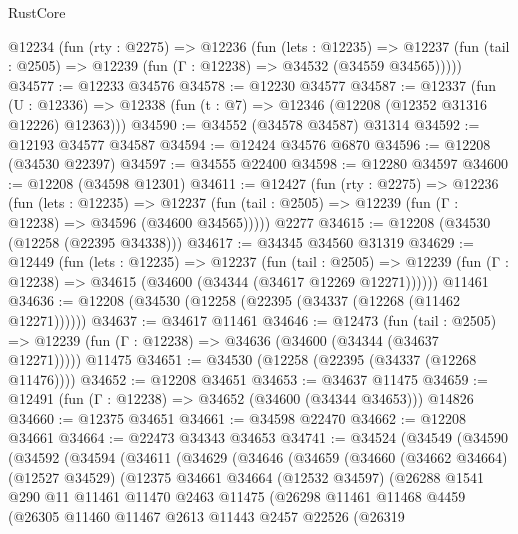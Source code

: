 \begin{lexlean}{RustCore}
\begin{coremodule}
  @12234
    (fun (rty : @2275) =>
    @12236
      (fun (lets : @12235) =>
      @12237 (fun (tail : @2505) => @12239 (fun (Γ : @12238) => @34532 (@34559 @34565)))))
@34577 := @12233 @34576
@34578 := @12230 @34577
@34587 := @12337
    (fun (U : @12336) => @12338 (fun (t : @7) => @12346 (@12208 (@12352 @31316 @12226) @12363)))
@34590 := @34552 (@34578 @34587) @31314
@34592 := @12193 @34577 @34587
@34594 := @12424 @34576 @6870
@34596 := @12208 (@34530 @22397)
@34597 := @34555 @22400
@34598 := @12280 @34597
@34600 := @12208 (@34598 @12301)
@34611 := @12427
    (fun (rty : @2275) =>
    @12236
      (fun (lets : @12235) =>
      @12237 (fun (tail : @2505) => @12239 (fun (Γ : @12238) => @34596 (@34600 @34565)))))
    @2277
@34615 := @12208 (@34530 (@12258 (@22395 @34338)))
@34617 := @34345 @34560 @31319
@34629 := @12449
    (fun (lets : @12235) =>
    @12237
      (fun (tail : @2505) =>
      @12239 (fun (Γ : @12238) => @34615 (@34600 (@34344 (@34617 @12269 @12271))))))
    @11461
@34636 := @12208 (@34530 (@12258 (@22395 (@34337 (@12268 (@11462 @12271))))))
@34637 := @34617 @11461
@34646 := @12473
    (fun (tail : @2505) => @12239 (fun (Γ : @12238) => @34636 (@34600 (@34344 (@34637 @12271)))))
    @11475
@34651 := @34530 (@12258 (@22395 (@34337 (@12268 @11476))))
@34652 := @12208 @34651
@34653 := @34637 @11475
@34659 := @12491 (fun (Γ : @12238) => @34652 (@34600 (@34344 @34653))) @14826
@34660 := @12375 @34651
@34661 := @34598 @22470
@34662 := @12208 @34661
@34664 := @22473 @34343 @34653
@34741 := @34524
    (@34549
      (@34590
        (@34592
          (@34594
            (@34611
              (@34629
                (@34646
                  (@34659
                    (@34660
                      (@34662 @34664)
                      (@12527 @34529)
                      (@12375
                        @34661
                        @34664
                        (@12532 @34597)
                        (@26288
                          @1541
                          @290
                          @11
                          @11461
                          @11470
                          @2463
                          @11475
                          (@26298
                            @11461
                            @11468
                            @4459
                            (@26305
                              @11460
                              @11467
                              @2613
                              @11443
                              @2457
                              @22526
                              (@26319

\end{coremodule}
\end{lexlean}

